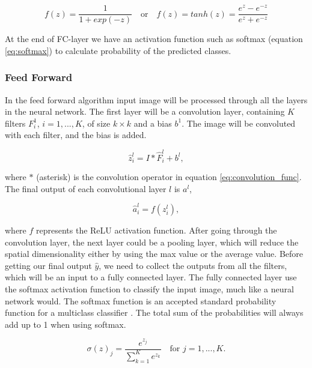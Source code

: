 \documentclass[thesis.tex]{subfiles}
\begin{document}
\begin{equation} %
  f(z) = \frac{1}{1+exp(-z)} \quad \text{or} \quad f(z) = tanh(z) = \frac{e^{z} - e^{-z}}{e^{z} + e^{-z}}
\end{equation}

At the end of FC-layer we have an activation function such as softmax (equation \ref{eq:softmax}) to calculate probability of the predicted classes.


\subsubsection{Feed Forward}
In the feed forward algorithm input image will be processed through all the layers in the neural network. The first layer will be a convolution layer, containing $K$ filters $F_i^1$, $i= 1, ..., K$, of size $k \times k$ and a bias $b^1$. The image will be convoluted with each filter, and the bias is added. 

\begin{equation}
    \hat{z}_i^l = I * \hat{F}_i^l + b^l, 
\end{equation}

where $*$ (asterisk) is the convolution operator in equation \ref{eq:convolution_func}. The final output of each convolutional layer $l$ is $a^l$,

\begin{equation}
    \hat{a}_i^l = f(z_i^l), 
\end{equation}

where $f$ represents the ReLU activation function. After going through the convolution layer, the next layer could be a pooling layer, which will reduce the spatial dimensionality either by using the max value or the average value.
Before getting our final output $\hat{y}$, we need to collect the outputs from all the filters, which will be an input to a fully connected layer. 
The fully connected layer use the softmax activation function to classify the input image, much like a neural network would. The softmax function is an accepted standard probability function for a multiclass classifier \cite{NotesBackpropagation16}. The total sum of the probabilities will always add up to 1 when using softmax. 

\begin{equation} %
  \sigma(z)_j = \frac{e^{z_j}}{\sum_{k=1}^{K} e^{z_k}} \quad \text{for } j = 1, ..., K.
  \label{eq:softmax}
\end{equation}
\end{document}
